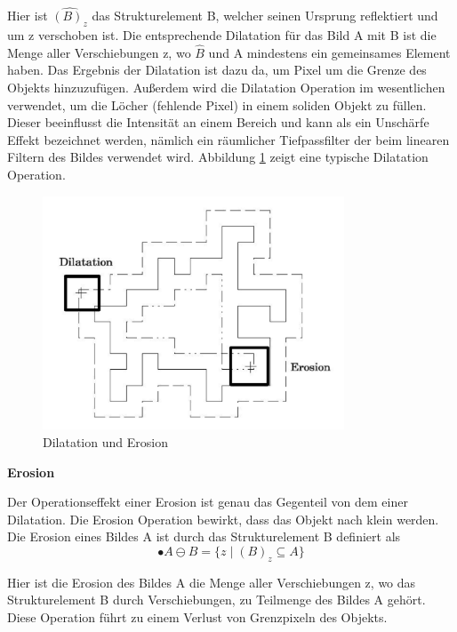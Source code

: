 Hier ist $ \widehat{(B)_z} $ das Strukturelement B, welcher seinen Ursprung reflektiert und um z verschoben ist. Die entsprechende Dilatation für das Bild A mit B ist die Menge aller Verschiebungen z, wo $ \widehat{B} $ und A mindestens ein gemeinsames Element haben. Das Ergebnis der Dilatation ist dazu da, um Pixel um die Grenze des Objekts hinzuzufügen. Außerdem wird die Dilatation Operation im wesentlichen verwendet, um die Löcher (fehlende Pixel) in einem soliden Objekt zu füllen. Dieser beeinflusst die Intensität an einem Bereich und kann als ein Unschärfe Effekt bezeichnet werden, nämlich ein räumlicher Tiefpassfilter der beim linearen Filtern des Bildes verwendet wird. Abbildung \ref{fig:Dilatation und Erosion} zeigt eine typische Dilatation Operation.

\begin{figure}[H]
 \centering 
  \includegraphics[keepaspectratio,width=0.8\textwidth]{images/4_ZweiteErfahrung/Morphological/DilatationundErosion.pdf}
 \caption{Dilatation und Erosion}
 \label{fig:Dilatation und Erosion}
\end{figure} 


\textbf{Erosion}

Der Operationseffekt einer Erosion ist genau das Gegenteil von dem einer Dilatation. Die Erosion Operation bewirkt, dass das Objekt nach klein werden. Die Erosion eines Bildes A ist durch das Strukturelement B definiert als 
\begin{equation}
•A \ominus B =\lbrace z \mid (B)_z \subseteq A \rbrace  
\end{equation}

Hier ist die Erosion des Bildes A die Menge aller Verschiebungen z, wo das Strukturelement B durch Verschiebungen, zu Teilmenge des Bildes A gehört. Diese Operation führt zu einem Verlust von Grenzpixeln des Objekts.

